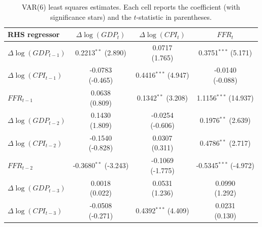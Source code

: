 \documentclass[12pt]{article}
\begin{document}
\begin{enumerate}[label=\alph*.]
   \begin{table}[H]
   \centering
   \caption{VAR(6) least squares estimates. Each cell reports the coefficient (with significance stars) and the \(t\)-statistic in parentheses.}
   \begin{tabular}{l c c c}
   \hline
   RHS regressor & \(\Delta \log(GDP_t)\) & \(\Delta \log(CPI_t)\) & \(FFR_t\) \\
   \hline
   \(\Delta \log(GDP_{t-1})\) & \shortstack{0.2213$^{**}$\\(2.890)} & \shortstack{0.0717\\(1.765)} & \shortstack{0.3751$^{***}$\\(5.171)} \\
   \(\Delta \log(CPI_{t-1})\) & \shortstack{-0.0783\\(-0.465)} & \shortstack{0.4416$^{***}$\\(4.947)} & \shortstack{-0.0140\\(-0.088)} \\
   \(FFR_{t-1}\)              & \shortstack{0.0638\\(0.809)} & \shortstack{0.1342$^{**}$\\(3.208)} & \shortstack{1.1156$^{***}$\\(14.937)} \\
   \(\Delta \log(GDP_{t-2})\) & \shortstack{0.1430\\(1.809)} & \shortstack{-0.0254\\(-0.606)} & \shortstack{0.1976$^{**}$\\(2.639)} \\
   \(\Delta \log(CPI_{t-2})\) & \shortstack{-0.1540\\(-0.828)} & \shortstack{0.0307\\(0.311)} & \shortstack{0.4786$^{**}$\\(2.717)} \\
   \(FFR_{t-2}\)              & \shortstack{-0.3680$^{**}$\\(-3.243)} & \shortstack{-0.1069\\(-1.775)} & \shortstack{-0.5345$^{***}$\\(-4.972)} \\
   \(\Delta \log(GDP_{t-3})\) & \shortstack{0.0018\\(0.022)} & \shortstack{0.0531\\(1.236)} & \shortstack{0.0990\\(1.292)} \\
   \(\Delta \log(CPI_{t-3})\) & \shortstack{-0.0508\\(-0.271)} & \shortstack{0.4392$^{***}$\\(4.409)} & \shortstack{0.0231\\(0.130)} \\

\end{tabular}
\end{table}
\end{enumerate}
\end{document}
